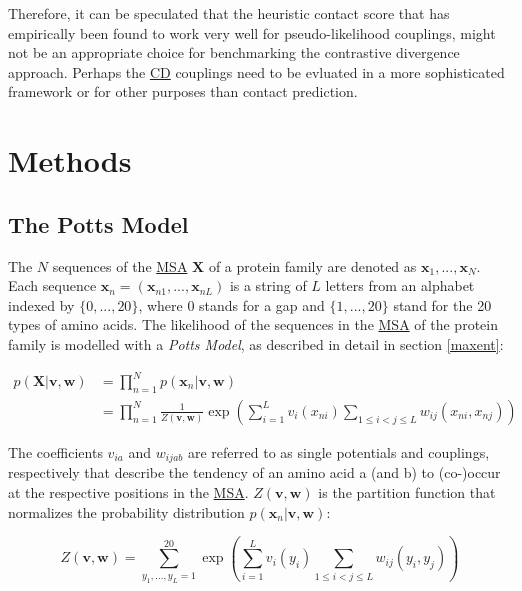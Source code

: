 \documentclass[11pt,a4paper,twoside]{book}
\newcommand{\seq}{\mathbf{x}}
\renewcommand{\v}{\mathbf{v}}
\newcommand{\via}{v_{ia}}
\newcommand{\w}{\mathbf{w}}
\newcommand{\wijab}{w_{ijab}}
\newcommand{\X}{\mathbf{X}}
\theoremstyle{definition}
\theoremstyle{definition}
\theoremstyle{remark}
\begin{document}
Therefore, it can be speculated that the heuristic contact score that
has empirically been found to work very well for pseudo-likelihood
couplings, might not be an appropriate choice for benchmarking the
contrastive divergence approach. Perhaps the
\protect\hyperlink{abbrev}{CD} couplings need to be evluated in a more
sophisticated framework or for other purposes than contact prediction.

\newpage 

\section{Methods}\label{methods-1}

\subsection{The Potts Model}\label{potts-full-likelihood}

The \(N\) sequences of the \protect\hyperlink{abbrev}{MSA} \(\X\) of a
protein family are denoted as \({\seq_1, ..., \seq_N}\). Each sequence
\(\seq_n = (\seq_{n1}, ..., \seq_{nL})\) is a string of \(L\) letters
from an alphabet indexed by \(\{0, ..., 20\}\), where 0 stands for a gap
and \(\{1, ... , 20\}\) stand for the 20 types of amino acids. The
likelihood of the sequences in the \protect\hyperlink{abbrev}{MSA} of
the protein family is modelled with a \emph{Potts Model}, as described
in detail in section \ref{maxent}:

\begin{align}
    p(\X | \v, \w) &= \prod_{n=1}^N p(\seq_n | \v, \w) \nonumber \\
                   &= \prod_{n=1}^N \frac{1}{Z(\v, \w)} \exp \left( \sum_{i=1}^L v_i(x_{ni}) \sum_{1 \leq i < j \leq L} w_{ij}(x_{ni}, x_{nj}) \right)
\end{align}

The coefficients \(\via\) and \(\wijab\) are referred to as single
potentials and couplings, respectively that describe the tendency of an
amino acid a (and b) to (co-)occur at the respective positions in the
\protect\hyperlink{abbrev}{MSA}. \(Z(\v, \w)\) is the partition function
that normalizes the probability distribution \(p(\seq_n |\v, \w)\):

\begin{equation}
  Z(\v, \w) = \sum_{y_1, ..., y_L = 1}^{20} \exp \left( \sum_{i=1}^L v_i(y_i) \sum_{1 \leq i < j \leq L} w_{ij}(y_i, y_j)  \right)
\end{equation}
\end{document}
